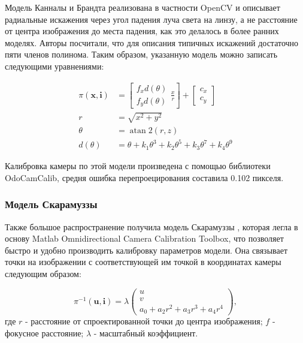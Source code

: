 Модель Канналы и 
Брандта \cite{opencv_model} реализована в частности OpenCV и описывает радиальные искажения через угол падения луча света на линзу, а не расстояние  
от центра изображения до места падения, как это делалось в более ранних моделях. Авторы посчитали, что для описания типичных искажений достаточно 
пяти членов полинома. Таким образом, указанную модель можно записать следующими уравнениями:

\begin{equation}
\begin{aligned}
	\pi(\mathbf{x}, \mathbf{i}) &=\left[\begin{array}{l}
	f_{x} d(\theta) \\
	f_{y} d(\theta)
	\end{array} \frac{x}{r}\right]+\left[\begin{array}{c}
	c_{x} \\
	c_{y}
	\end{array}\right] \\
	r &=\sqrt{x^{2}+y^{2}} \\
	\theta &=\operatorname{atan} 2(r, z) \\
	d(\theta) &=\theta+k_{1} \theta^{3}+k_{2} \theta^{5}+k_{3} \theta^{7}+k_{4} \theta^{9}
\end{aligned}
\end{equation}

Калибровка камеры по этой модели произведена с помощью библиотеки OdoCamCalib, средня ошибка перепроецирования 
составила 0.102 пикселя. 

\subsubsection{Модель Скарамуззы}

Также большое распространение получила модель Скарамуззы \cite{scaramuzza}, которая легла в основу Matlab Omnidirectional 
Camera Calibration Toolbox, что позволяет быстро и удобно производить калибровку параметров модели.  Она связывает точки 
на изображении с соответствующей им точкой в координатах камеры следующим образом:

\begin{equation}	
    \pi^{-1}(\mathbf{u}, \mathbf{i}) = \lambda \begin{pmatrix}u\\v\\a_0 + a_2 r^2 + a_3 r^3 + a_4 r^4\end{pmatrix},
    \label{eqn:scaramuzza}
\end{equation}
где  $r$ - расстояние от спроектированной точки до центра изображения; $f$ - фокусное расстояние; $\lambda$ - масштабный коэффициент.

